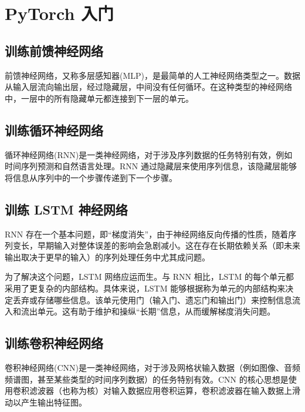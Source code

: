 \chapter{PyTorch 入门}
\section{训练前馈神经网络}
前馈神经网络，又称多层感知器(MLP)，是最简单的人工神经网络类型之一。数据从输入层流向输出层，经过隐藏层，中间没有任何循环。在这种类型的神经网络中，一层中的所有隐藏单元都连接到下一层的单元。
\section{训练循环神经网络}
循环神经网络(RNN)是一类神经网络，对于涉及序列数据的任务特别有效，例如时间序列预测和自然语言处理。RNN 通过隐藏层来使用序列信息，该隐藏层能够将信息从序列中的一个步骤传递到下一个步骤。
\section{训练 LSTM 神经网络}
RNN 存在一个基本问题，即“梯度消失”，由于神经网络反向传播的性质，随着序列变长，早期输入对整体误差的影响会急剧减小。这在存在长期依赖关系（即未来输出取决于更早的输入）的序列处理任务中尤其成问题。

为了解决这个问题，LSTM 网络应运而生。与 RNN 相比，LSTM 的每个单元都采用了更复杂的内部结构。具体来说，LSTM 能够根据称为单元的内部结构来决定丢弃或存储哪些信息。该单元使用门（输入门、遗忘门和输出门）来控制信息流入和流出单元。这有助于维护和操纵“长期”信息，从而缓解梯度消失问题。
\section{训练卷积神经网络}
卷积神经网络(CNN)是一类神经网络，对于涉及网格状输入数据（例如图像、音频频谱图，甚至某些类型的时间序列数据）的任务特别有效。CNN 的核心思想是使用卷积滤波器（也称为核）对输入数据应用卷积运算，卷积滤波器在输入数据上滑动以产生输出特征图。